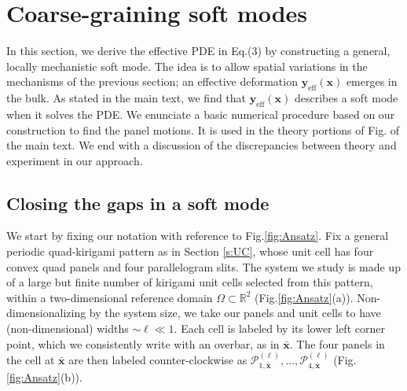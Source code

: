 \documentclass[aps,11pt,tightenlines,notitlepage,superscriptaddress,longbibliography,nofootinbib]{revtex4-1}
\begin{document}
\section{Coarse-graining soft modes}
In this section, we derive the effective PDE in Eq.\;(3) by constructing a general, locally mechanistic soft mode. The idea is to allow spatial variations in the mechanisms of the previous section; an effective deformation $\mathbf{y}_\text{eff}(\mathbf{x})$ emerges in the bulk. As stated in the main text, we find that $\mathbf{y}_\text{eff}(\mathbf{x})$ describes a soft mode when it solves the PDE. We enunciate a basic numerical procedure based on our construction to find the panel motions. It is used in the theory portions of Fig. of the main text. We end with a discussion of the discrepancies between theory and experiment in our approach.

\subsection{Closing the gaps in a soft mode}\label{s:Gaps}

We start by fixing our notation with reference to Fig.\;\ref{fig:Ansatz}. Fix a general periodic quad-kirigami pattern as in Section \ref{s:UC}, whose unit cell has four convex quad panels and four parallelogram slits. The system we study is made up of a large but finite number of kirigami unit cells selected from this pattern, within a two-dimensional reference domain $\Omega\subset\mathbb{R}^2$ (Fig.\;\ref{fig:Ansatz}(a)).
Non-dimensionalizing by the system size, we take our panels and unit cells to have (non-dimensional) widths $\sim \ell \ll 1$. Each cell is labeled by its lower left corner point, which we consistently write with an overbar, as in $\bar{\mathbf{x}}$. The four panels in the cell at $\bar{\mathbf{x}}$ are then labeled counter-clockwise as $\mathcal{P}_{1, \bar{\mathbf{x}}}^{(\ell)}, \ldots, \mathcal{P}_{4,\bar{\mathbf{x}}}^{(\ell)}$ (Fig.\;\ref{fig:Ansatz}(b)). 
\end{document}
